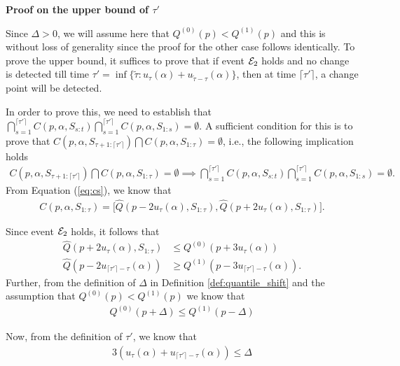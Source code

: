 \textbf{Proof on the upper bound of $\tau'$}

Since $\Delta > 0$, we will assume here that $Q^{(0)}(p) < Q^{(1)}(p)$ and this is without loss of generality since the proof for the other case follows identically. 
To prove the upper bound, it suffices to prove that if event ${\mathcal{E}}_2$ holds and no change is detected till time $\tau' = \inf \{\widetilde{\tau}: u_{\tau}(\alpha)+ u_{\widetilde{\tau}-\tau}(\alpha) \}$, then at time $\lceil \tau' \rceil$, a change point will be detected. 

In order to prove this, we need to establish that $\bigcap_{s=1}^{\lceil \tau' \rceil} C(p,\alpha,S_{s:t}) \bigcap_{s=1}^{\lceil \tau' \rceil} C(p,\alpha,S_{1:s}) = \emptyset$. A sufficient condition for this is to prove that $C(p,\alpha,S_{\tau+1:\lceil \tau' \rceil}) \bigcap C(p,\alpha,S_{1:\tau}) = \emptyset$, i.e., the following implication holds 
\begin{align}
    C(p,\alpha,S_{\tau+1:\lceil \tau' \rceil}) \bigcap C(p,\alpha,S_{1:\tau}) = \emptyset \implies \bigcap_{s=1}^{\lceil \tau' \rceil} C(p,\alpha,S_{s:t}) \bigcap_{s=1}^{\lceil \tau' \rceil} C(p,\alpha,S_{1:s}) = \emptyset.
    \label{eqn:setting_2_internal_implication}
\end{align}
From Equation (\ref{eq:cs}), we know that 
\begin{align*}
     C(p,\alpha,S_{1:\tau}) = \bigg[ \widehat{Q}(p-2u_{\tau}(\alpha), S_{1:\tau}), \widehat{Q}(p+2u_{\tau}(\alpha), S_{1:\tau}) \bigg].
\end{align*}

Since event ${\mathcal{E}}_2$ holds, it follows that 
\begin{align}
    \widehat{Q}(p+2u_{\tau}(\alpha),S_{1:\tau}) &\leq Q^{(0)}(p+3u_{\tau}(\alpha))     \label{eqn:setting_2_delay_pf_11}\\
    \widehat{Q}(p-2u_{\lceil \tau' \rceil - \tau}(\alpha)) &\geq Q^{(1)}(p - 3u_{\lceil \tau' \rceil-\tau}(\alpha)).
    \label{eqn:setting_2_delay_pf_1}
\end{align}
Further, from the definition of $\Delta$ in Definition \ref{def:quantile_shift} and the assumption that $Q^{(0)}(p) < Q^{(1)}(p)$ we know that 
\begin{align}    
Q^{(0)}( p + {\Delta} ) \leq Q^{(1)}(p - {\Delta})
    \label{eqn:setting_2_delay_pf_2}
\end{align}

Now, from the definition of $\tau'$, we know that 
\begin{align}
    3(u_{\tau}(\alpha) + u_{\lceil {\tau'} \rceil-\tau}(\alpha)) \leq {\Delta}
        \label{eqn:setting_2_delay_pf_3}
\end{align}

